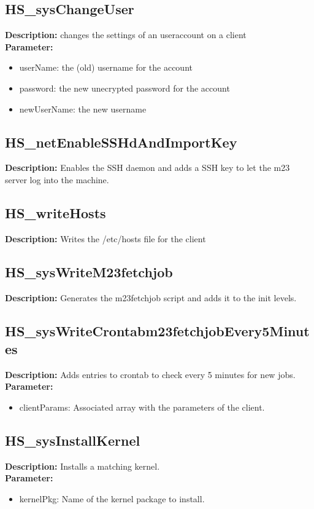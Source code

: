 \subsection{HS\_sysChangeUser}
\textbf{Description:} changes the settings of an useraccount on a client\\
\textbf{Parameter:}
\begin{itemize}
\item userName: the (old) username for the account
\item password: the new unecrypted password for the account
\item newUserName: the new username
\end{itemize}

\subsection{HS\_netEnableSSHdAndImportKey}
\textbf{Description:} Enables the SSH daemon and adds a SSH key to let the m23 server log into the machine.\\

\subsection{HS\_writeHosts}
\textbf{Description:} Writes the /etc/hosts file for the client\\

\subsection{HS\_sysWriteM23fetchjob}
\textbf{Description:} Generates the m23fetchjob script and adds it to the init levels.\\

\subsection{HS\_sysWriteCrontabm23fetchjobEvery5Minutes}
\textbf{Description:} Adds entries to crontab to check every 5 minutes for new jobs.\\
\textbf{Parameter:}
\begin{itemize}
\item clientParams: Associated array with the parameters of the client.
\end{itemize}

\subsection{HS\_sysInstallKernel}
\textbf{Description:} Installs a matching kernel.\\
\textbf{Parameter:}
\begin{itemize}
\item kernelPkg: Name of the kernel package to install.
\end{itemize}

